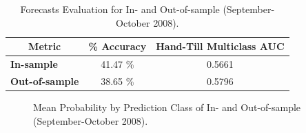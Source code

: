 \begin{table}[H]
\centering
\begin{tabular}{@{}lcc@{}}
\toprule
\multicolumn{1}{c}{Metric} & \multicolumn{1}{l}{\textbf{\% Accuracy}} & \multicolumn{1}{l}{\textbf{Hand-Till Multiclass AUC}} \\ \midrule
\textbf{In-sample}         & 41.47 \%                                 & 0.5661                                                \\
\textbf{Out-of-sample}     & 38.65 \%                                 & 0.5796                                                \\ \bottomrule
\end{tabular}
\caption{Forecasts Evaluation for In- and Out-of-sample (September-October 2008).}
\label{tab:table-29}
\end{table}



\begin{figure}[H]
    \centering
    \caption{Mean Probability by Prediction Class of In- and Out-of-sample (September-October 2008).}
    \label{fig:figure-7}
\end{figure}
